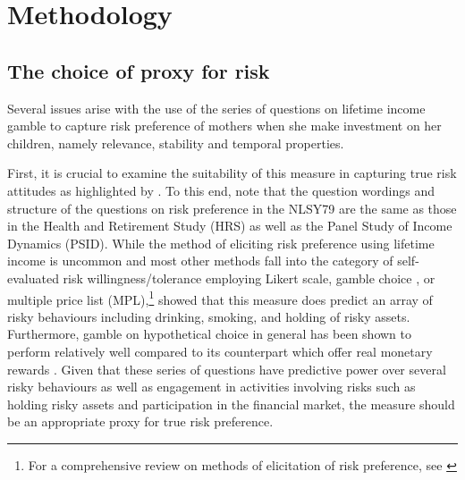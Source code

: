 \documentclass[]{article}
\begin{document}


\section{Methodology}
\subsection{The choice of proxy for risk}
Several issues arise with the use of the series of questions on lifetime income gamble to capture risk preference of mothers when she make investment on her children, namely relevance, stability and temporal properties. 

First, it is crucial to examine the suitability of this measure in capturing true risk attitudes as highlighted by \citet{yilmazer2015portfolio}. To this end, note that the question wordings and structure of the questions on risk preference in the NLSY79 are the same as those in the Health and Retirement Study (HRS) as well as the Panel Study of Income Dynamics (PSID). While the method of eliciting risk preference using lifetime income is uncommon and most other methods fall into the category of self-evaluated risk willingness/tolerance employing Likert scale, gamble choice \citep{eckel2002sex}, or multiple price list (MPL),\footnote{For a comprehensive review on methods of elicitation of risk preference, see \citet{charness2013experimental}} \citet{barsky1997preference} showed that this measure does predict an array of risky behaviours including drinking, smoking, and holding of risky assets. Furthermore, gamble on hypothetical choice in general has been shown to perform relatively well compared to its counterpart which offer real monetary rewards \citep{binswanger1981attitudes, camerer1999effects, dohmen2005individual}. Given that these series of questions have predictive power over several risky behaviours as well as engagement in activities involving risks such as holding risky assets and participation in the financial market, the measure should be an appropriate proxy for true risk preference. 
\end{document}
